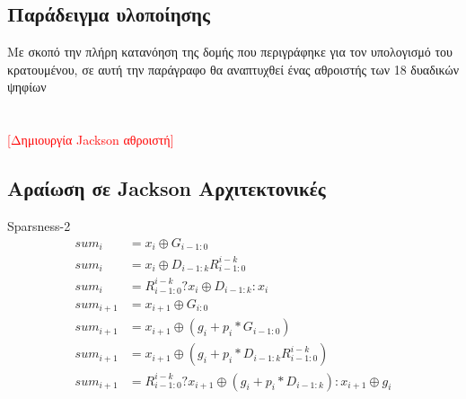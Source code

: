 \subsection{Παράδειγμα υλοποίησης}
Με σκοπό την πλήρη κατανόηση της δομής που περιγράφηκε για τον υπολογισμό του κρατουμένου,
σε αυτή την παράγραφο θα αναπτυχθεί ένας αθροιστής των 18 δυαδικών ψηφίων  
\\\\\\
\textcolor{red}{[Δημιουργία Jackson αθροιστή]}

\subsection{Αραίωση σε Jackson Αρχιτεκτονικές}
Sparsness-2
 \begin{equation*}
    \begin{split}
        sum_i &= x_i \oplus G_{i-1:0}\\
        sum_i &= x_i \oplus D_{i-1:k}R^{i-k}_{i-1:0}\\
        sum_i &= R^{i-k}_{i-1:0} ? x_i \oplus D_{i-1:k} : x_i\\
        sum_{i+1} &= x_{i+1} \oplus G_{i:0}\\
        sum_{i+1} &= x_{i+1} \oplus (g_i + p_i*G_{i-1:0})\\
        sum_{i+1} &= x_{i+1} \oplus (g_i + p_i*D_{i-1:k}R^{i-k}_{i-1:0})\\
        sum_{i+1} &= R^{i-k}_{i-1:0} ? x_{i+1} \oplus (g_i + p_i*D_{i-1:k}) : x_{i+1} \oplus g_i
    \end{split} 
 \end{equation*}






